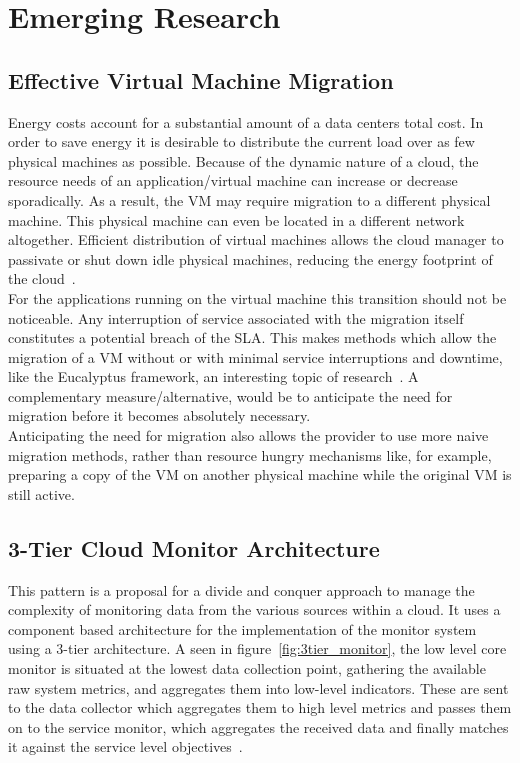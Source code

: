 \documentclass[a4paper]{llncs}
\begin{document}
\section{Emerging Research}

\subsection{Effective Virtual Machine Migration}

Energy costs account for a substantial amount of a data centers total cost. In order to save energy it is desirable to distribute the current load over as few physical machines as possible. Because of the dynamic nature of a cloud, the resource needs of an application/virtual machine can increase or decrease sporadically. As a result, the VM may require migration to a different physical machine. This physical machine can even be located in a different network altogether. Efficient distribution of virtual machines allows the cloud manager to passivate or shut down idle physical machines, reducing the energy footprint of the cloud~\cite{Graubner}.\\

For the applications running on the virtual machine this transition should not be noticeable. Any interruption of service associated with the migration itself constitutes a potential breach of the SLA. This makes methods which allow the migration of a VM without or with minimal service interruptions and downtime, like the Eucalyptus framework, an interesting topic of research~\cite{Zhao09}. A complementary measure/alternative, would be to anticipate the need for migration before it becomes absolutely necessary.\\
Anticipating the need for migration also allows the provider to use more naive migration methods, rather than resource hungry mechanisms like, for example, preparing a copy of the VM on another physical machine while the original VM is still active.

\subsection{3-Tier Cloud Monitor Architecture}
This pattern is a proposal for a divide and conquer approach to manage the complexity of monitoring data from the various sources within a cloud. It uses a component based architecture for the implementation of the monitor system using a 3-tier architecture.
A seen in figure~\ref{fig:3tier_monitor}, the low level core monitor is situated at the lowest data collection point, gathering the available raw system metrics, and aggregates them into low-level indicators. These are sent to the data collector  which aggregates them to high level metrics and passes them on to the service monitor, which aggregates the received data and finally matches it against the service level objectives~\cite{Chazalet10}.\\
\end{document}
